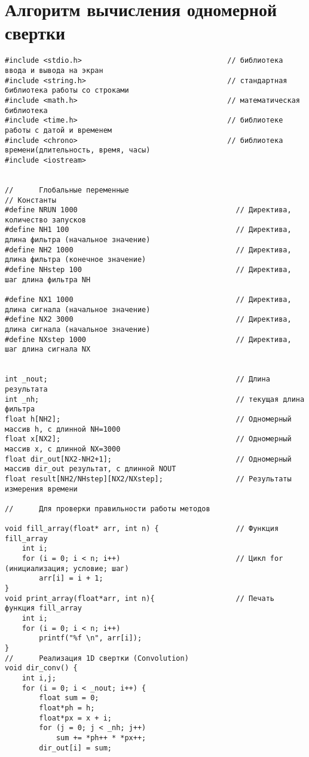 \chapter{Алгоритм вычисления одномерной свертки}\label{app:Ё}
\begin{lstlisting}
#include <stdio.h>                                  // библиотека ввода и вывода на экран
#include <string.h>                                 // стандартная библиотека работы со строками
#include <math.h>                                   // математическая библиотека
#include <time.h>                                   // библиотеке работы с датой и временем
#include <chrono>                                   // библиотека времени(длительность, время, часы)
#include <iostream>


//      Глобальные переменные
// Константы
#define NRUN 1000                                     // Директива, количество запусков
#define NH1 100                                       // Директива, длина фильтра (начальное значение)
#define NH2 1000                                      // Директива, длина фильтра (конечное значение)
#define NHstep 100                                    // Директива,  шаг длина фильтра NH

#define NX1 1000                                      // Директива, длина сигнала (начальное значение)
#define NX2 3000                                      // Директива, длина сигнала (начальное значение)
#define NXstep 1000                                   // Директива,  шаг длина сигнала NX


int _nout;                                            // Длина результата
int _nh;                                              // текущая длина фильтра
float h[NH2];                                         // Одномерный массив h, с длинной NH=1000
float x[NX2];                                         // Одномерный массив x, с длинной NX=3000
float dir_out[NX2-NH2+1];                             // Одномерный массив dir_out результат, с длинной NOUT
float result[NH2/NHstep][NX2/NXstep];                 // Результаты измерения времени

//      Для проверки правильности работы методов

void fill_array(float* arr, int n) {                  // Функция fill_array
    int i;
    for (i = 0; i < n; i++)                           // Цикл for (инициализация; условие; шаг)
        arr[i] = i + 1;
}
void print_array(float*arr, int n){                   // Печать функция fill_array
    int i;
    for (i = 0; i < n; i++)
        printf("%f \n", arr[i]);
}
//      Реализация 1D свертки (Convolution)
void dir_conv() {
    int i,j;
    for (i = 0; i < _nout; i++) {
        float sum = 0;
        float*ph = h;
        float*px = x + i;
        for (j = 0; j < _nh; j++)
            sum += *ph++ * *px++;
        dir_out[i] = sum;


\end{lstlisting}
